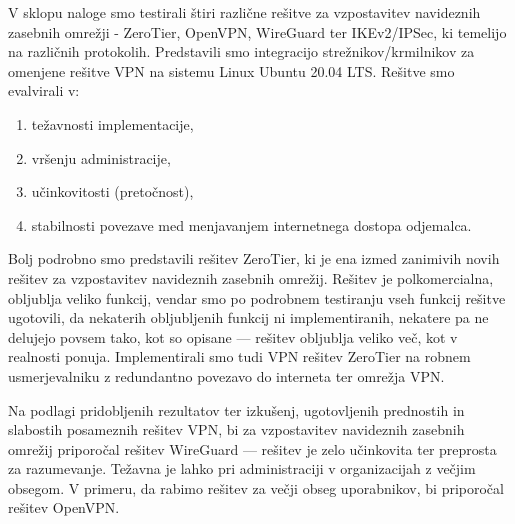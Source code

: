 \documentclass[a4paper, 12pt]{book}
\begin{document}
V sklopu naloge smo testirali štiri različne rešitve za vzpostavitev navideznih zasebnih omrežji - ZeroTier, OpenVPN, WireGuard ter IKEv2/IPSec, ki temelijo na različnih protokolih. Predstavili smo integracijo strežnikov/krmilnikov za omenjene rešitve VPN na sistemu Linux Ubuntu 20.04 LTS. Rešitve smo evalvirali v:
\begin{enumerate}
    \item težavnosti implementacije,
    \item vršenju administracije,
    \item učinkovitosti (pretočnost),
    \item stabilnosti povezave med menjavanjem internetnega dostopa odjemalca.
\end{enumerate}

Bolj podrobno smo predstavili rešitev ZeroTier, ki je ena izmed zanimivih novih rešitev za vzpostavitev navideznih zasebnih omrežij. Rešitev je polkomercialna, obljublja veliko funkcij, vendar smo po podrobnem testiranju vseh funkcij rešitve ugotovili, da nekaterih obljubljenih funkcij ni implementiranih, nekatere pa ne delujejo povsem tako, kot so opisane --- rešitev obljublja veliko več, kot v realnosti ponuja. Implementirali smo tudi VPN rešitev ZeroTier na robnem usmerjevalniku z redundantno povezavo do interneta ter omrežja VPN.

Na podlagi pridobljenih rezultatov ter izkušenj, ugotovljenih prednostih in slabostih posameznih rešitev VPN, bi za vzpostavitev navideznih zasebnih omrežij priporočal rešitev WireGuard --- rešitev je zelo učinkovita ter preprosta za razumevanje. Težavna je lahko pri administraciji v organizacijah z večjim obsegom. V primeru, da rabimo rešitev za večji obseg uporabnikov, bi priporočal rešitev OpenVPN.

\newpage %
\clearpage




\end{document}
